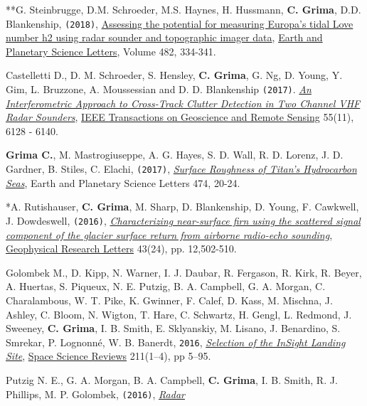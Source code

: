 \begin{etaremune}
  **G. Steinbrugge, D.M. Schroeder, M.S. Haynes, H. Hussmann,
  \textbf{C. Grima}, D.D. Blankenship, \texttt{(2018)},
  \href{https://www.sciencedirect.com/science/article/pii/S0012821X17306647}{Assessing
  the potential for measuring Europa's tidal Love number h2 using radar
  sounder and topographic imager data}, \ul{Earth and Planetary Science
  Letters}, Volume 482, 334-341.
\item
  Castelletti D., D. M. Schroeder, S. Hensley, \textbf{C. Grima}, G. Ng,
  D. Young, Y. Gim, L. Bruzzone, A. Moussessian and D. D. Blankenship
  \texttt{(2017)}.
  \href{http://ieeexplore.ieee.org/abstract/document/8012547/}{\emph{An
  Interferometric Approach to Cross-Track Clutter Detection in Two
  Channel VHF Radar Sounders}}, \ul{IEEE Transactions on Geoscience and
  Remote Sensing} 55(11), 6128 - 6140.
\item
  \textbf{Grima C.}, M. Mastrogiuseppe, A. G. Hayes, S. D. Wall, R. D.
  Lorenz, J. D. Gardner, B. Stiles, C. Elachi, \texttt{(2017)},
  \href{http://www.sciencedirect.com/science/article/pii/S0012821X17303163}{\emph{Surface
  Roughness of Titan's Hydrocarbon Seas}}, Earth and Planetary Science
  Letters 474, 20-24.
\item
  *A. Rutishauser, \textbf{C. Grima}, M. Sharp, D.
  Blankenship, D. Young, F. Cawkwell, J. Dowdeswell, \texttt{(2016)},
  \href{http://onlinelibrary.wiley.com/doi/10.1002/2016GL071230/full}{\emph{Characterizing
  near-surface firn using the scattered signal component of the glacier
  surface return from airborne radio-echo sounding}}, \ul{Geophysical
  Research Letters} 43(24), pp. 12,502-510.
\item
  Golombek M., D. Kipp, N. Warner, I. J. Daubar, R. Fergason, R. Kirk,
  R. Beyer, A. Huertas, S. Piqueux, N. E. Putzig, B. A. Campbell, G. A.
  Morgan, C. Charalambous, W. T. Pike, K. Gwinner, F. Calef, D. Kass, M.
  Mischna, J. Ashley, C. Bloom, N. Wigton, T. Hare, C. Schwartz, H.
  Gengl, L. Redmond, J. Sweeney, \textbf{C. Grima}, I. B. Smith, E.
  Sklyanskiy, M. Lisano, J. Benardino, S. Smrekar, P. Lognonné, W. B.
  Banerdt, \texttt{2016},
  \href{http://link.springer.com/article/10.1007/s11214-016-0321-9?wt_mc=Internal.Event.1.SEM.ArticleAuthorOnlineFirst}{\emph{Selection
  of the InSight Landing Site}}, \ul{Space Science Reviews} 211(1–4), pp 5–95.
\item
  Putzig N. E., G. A. Morgan, B. A. Campbell, \textbf{C. Grima}, I. B.
  Smith, R. J. Phillips, M. P. Golombek, \texttt{(2016)},
  \href{http://link.springer.com/article/10.1007\%2Fs11214-016-0322-8}{\emph{Radar
}}
\end{etaremune}
